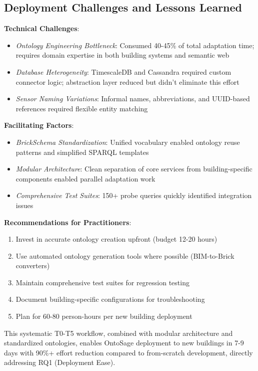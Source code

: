 \documentclass[acmlarge]{acmart}
\begin{document}
\subsection{Deployment Challenges and Lessons Learned}

\textbf{Technical Challenges}:
\begin{itemize}
    \item \textit{Ontology Engineering Bottleneck}: Consumed 40-45\% of total adaptation time; requires domain expertise in both building systems and semantic web
    \item \textit{Database Heterogeneity}: TimescaleDB and Cassandra required custom connector logic; abstraction layer reduced but didn't eliminate this effort
    \item \textit{Sensor Naming Variations}: Informal names, abbreviations, and UUID-based references required flexible entity matching
\end{itemize}

\textbf{Facilitating Factors}:
\begin{itemize}
    \item \textit{BrickSchema Standardization}: Unified vocabulary enabled ontology reuse patterns and simplified SPARQL templates
    \item \textit{Modular Architecture}: Clean separation of core services from building-specific components enabled parallel adaptation work
    \item \textit{Comprehensive Test Suites}: 150+ probe queries quickly identified integration issues
\end{itemize}

\textbf{Recommendations for Practitioners}:
\begin{enumerate}
    \item Invest in accurate ontology creation upfront (budget 12-20 hours)
    \item Use automated ontology generation tools where possible (BIM-to-Brick converters)
    \item Maintain comprehensive test suites for regression testing
    \item Document building-specific configurations for troubleshooting
    \item Plan for 60-80 person-hours per new building deployment
\end{enumerate}

This systematic T0-T5 workflow, combined with modular architecture and standardized ontologies, enables OntoSage deployment to new buildings in 7-9 days with 90\%+ effort reduction compared to from-scratch development, directly addressing RQ1 (Deployment Ease).
\end{document}
